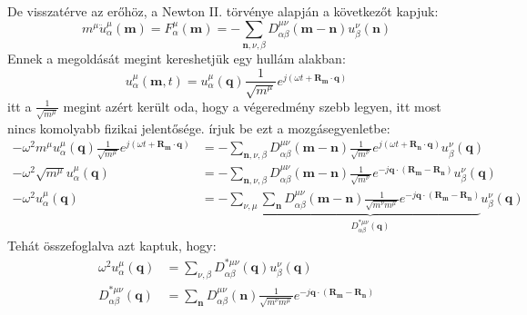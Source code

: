 \documentclass[../main.tex]{subfiles}
\begin{document}
De visszatérve az erőhöz, a Newton II. törvénye alapján a következőt kapjuk:
\begin{equation}
    m^\mu \ddot{u}_\alpha^\mu (\mathbf{m}) = F_\alpha^\mu (\mathbf{m}) = - \sum_{\mathbf{n}, \nu, \beta} D_{\alpha \beta}^{\mu \nu} (\mathbf{m} - \mathbf{n}) u_\beta^\nu (\mathbf{n})
\end{equation}
Ennek a megoldását megint kereshetjük egy hullám alakban:
\begin{equation}
    u_\alpha^\mu (\mathbf{m}, t) = u_\alpha^\mu (\mathbf{q}) \frac{1}{\sqrt{m^\mu}} e^{j (\omega t + \mathbf{R}_\mathbf{m} \cdot \mathbf{q})}
\end{equation}
itt a $\frac{1}{\sqrt{m^\mu}}$ megint azért került oda, hogy a végeredmény szebb legyen, itt most nincs komolyabb fizikai jelentősége. írjuk be ezt a mozgásegyenletbe:
\begin{equation}
    \begin{aligned}
        -\omega^2 m^\mu u_\alpha^\mu (\mathbf{q}) \frac{1}{\sqrt{m^\mu}} e^{j (\omega t + \mathbf{R}_\mathbf{m} \cdot \mathbf{q})} &= - \sum_{\mathbf{n}, \nu, \beta} D_{\alpha \beta}^{\mu \nu} (\mathbf{m} - \mathbf{n}) \frac{1}{\sqrt{m^\nu}} e^{j (\omega t + \mathbf{R}_\mathbf{n} \cdot \mathbf{q})} u_\beta^\nu (\mathbf{q}) \\
        -\omega^2 \sqrt{m^\mu} u_\alpha^\mu (\mathbf{q}) &= - \sum_{\mathbf{n}, \nu, \beta} D_{\alpha \beta}^{\mu \nu} (\mathbf{m} - \mathbf{n}) \frac{1}{\sqrt{m^\nu}} e^{-j \mathbf{q} \cdot (\mathbf{R}_\mathbf{m} - \mathbf{R}_\mathbf{n})} u_\beta^\nu (\mathbf{q}) \\
        -\omega^2 u_\alpha^\mu (\mathbf{q}) &= - \sum_{\nu, \mu} \underbrace{\sum_{\mathbf{n}} D_{\alpha \beta}^{\mu \nu} (\mathbf{m} - \mathbf{n}) \frac{1}{\sqrt{m^\nu m^\mu}} e^{-j \mathbf{q} \cdot (\mathbf{R}_\mathbf{m} - \mathbf{R}_\mathbf{n})}}_{D^{* \mu \nu}_{\alpha \beta} (\mathbf{q})} u_\beta^\nu (\mathbf{q})
    \end{aligned}
\end{equation}
Tehát összefoglalva azt kaptuk, hogy:
\begin{equation}
    \boxed{
    \begin{aligned}
        \omega^2 u_\alpha^\mu (\mathbf{q}) &= \sum_{\nu, \beta} D^{* \mu \nu}_{\alpha \beta} (\mathbf{q}) u_\beta^\nu (\mathbf{q}) \\
        D^{* \mu \nu}_{\alpha \beta} (\mathbf{q}) &= \sum_{\mathbf{n}} D_{\alpha \beta}^{\mu \nu} (\mathbf{n}) \frac{1}{\sqrt{m^\nu m^\mu}} e^{-j \mathbf{q} \cdot (\mathbf{R}_\mathbf{m} - \mathbf{R}_\mathbf{n})}
    \end{aligned}}
\end{equation}
\end{document}
